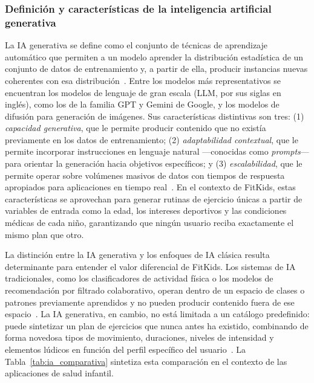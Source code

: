 				\subsubsection{Definición y características de la inteligencia artificial generativa}
					La IA generativa se define como el conjunto de técnicas de aprendizaje automático que permiten a un modelo aprender la distribución estadística de un conjunto de datos de entrenamiento y, a partir de ella, producir instancias nuevas coherentes con esa distribución~\cite{Cao2023}. Entre los modelos más representativos se encuentran los modelos de lenguaje de gran escala (LLM, por sus siglas en inglés), como los de la familia GPT y Gemini de Google, y los modelos de difusión para generación de imágenes. Sus características distintivas son tres: (1) \textit{capacidad generativa}, que le permite producir contenido que no existía previamente en los datos de entrenamiento; (2) \textit{adaptabilidad contextual}, que le permite incorporar instrucciones en lenguaje natural ---conocidas como \textit{prompts}--- para orientar la generación hacia objetivos específicos; y (3) \textit{escalabilidad}, que le permite operar sobre volúmenes masivos de datos con tiempos de respuesta apropiados para aplicaciones en tiempo real~\cite{Sengar2024}. En el contexto de FitKids, estas características se aprovechan para generar rutinas de ejercicio únicas a partir de variables de entrada como la edad, los intereses deportivos y las condiciones médicas de cada niño, garantizando que ningún usuario reciba exactamente el mismo plan que otro.
					
					La distinción entre la IA generativa y los enfoques de IA clásica resulta determinante para entender el valor diferencial de FitKids. Los sistemas de IA tradicionales, como los clasificadores de actividad física o los modelos de recomendación por filtrado colaborativo, operan dentro de un espacio de clases o patrones previamente aprendidos y no pueden producir contenido fuera de ese espacio~\cite{Cao2023}. La IA generativa, en cambio, no está limitada a un catálogo predefinido: puede sintetizar un plan de ejercicios que nunca antes ha existido, combinando de forma novedosa tipos de movimiento, duraciones, niveles de intensidad y elementos lúdicos en función del perfil específico del usuario~\cite{Sengar2024}. La Tabla~\ref{tab:ia_comparativa} sintetiza esta comparación en el contexto de las aplicaciones de salud infantil.
					
